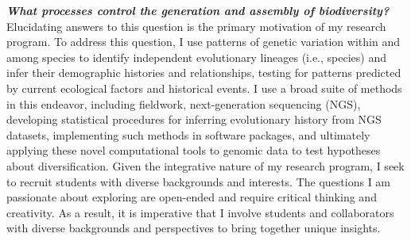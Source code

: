 \textbf{\textit{What processes control the generation and assembly of
        biodiversity?}}
Elucidating answers to this question is the primary motivation of my research
program.
To address this question, I use patterns of genetic variation within and among
species to identify independent evolutionary lineages (i.e., species) and infer
their demographic histories and relationships, testing for patterns predicted
by current ecological factors and historical events.
I use a broad suite of methods in this endeavor, including
fieldwork,
next-generation sequencing (NGS),
developing statistical procedures for inferring evolutionary
history from NGS datasets,
implementing such methods in software packages,
and ultimately applying these novel computational tools to genomic data to test
hypotheses about diversification.
Given the integrative nature of my research program, I seek to recruit students
with diverse backgrounds and interests.
The questions I am passionate about exploring are open-ended and require
critical thinking and creativity.
As a result, it is imperative that I involve students and collaborators with
diverse backgrounds and perspectives to bring together unique insights.

